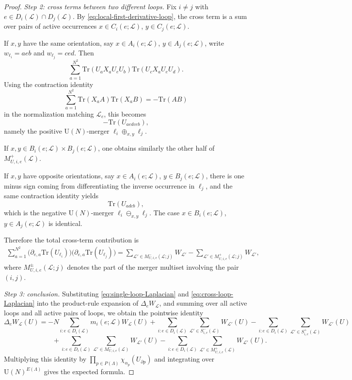 \documentclass[10pt,a4paper]{amsart}
\newcommand\Lc{{\mathcal{L}}}
\newcommand\Tr{\mathrm{Tr}}
\newcommand\U{{\mathrm U}}
\begin{document}
\begin{proof}
\smallskip

\emph{Step 2: cross terms between two different loops.}
Fix $i\neq j$ with $e\in D_i(\Lc)\cap D_j(\Lc)$. By \eqref{eq:local-first-derivative-loop}, the cross term is a sum over pairs of active occurrences $x\in C_i(e;\Lc)$, $y\in C_j(e;\Lc)$.

If $x,y$ have the same orientation, say $x\in A_i(e;\Lc)$, $y\in A_j(e;\Lc)$, write $w_{\ell_i}=aeb$ and $w_{\ell_j}=ced$. Then
\[
\sum_{a=1}^{N^2}\Tr(U_aX_aU_eU_b)\Tr(U_cX_aU_eU_d).
\]
Using the contraction identity
\[
\sum_{a=1}^{N^2}\Tr(X_aA)\Tr(X_aB)=-\Tr(AB)
\]
in the normalization matching $\Lc_e$, this becomes
\[
-\Tr(U_{aedceb}),
\]
namely the positive $\U(N)$-merger $\ell_i\oplus_{x,y}\ell_j$.

If $x,y\in B_i(e;\Lc)\times B_j(e;\Lc)$, one obtains similarly the other half of $M^+_{U,i,e}(\Lc)$.

If $x,y$ have opposite orientations, say $x\in A_i(e;\Lc)$, $y\in B_j(e;\Lc)$, there is one minus sign coming from differentiating the inverse occurrence in $\ell_j$, and the same contraction identity yields
\[
\Tr(U_{adcb}),
\]
which is the negative $\U(N)$-merger $\ell_i\ominus_{x,y}\ell_j$. The case $x\in B_i(e;\Lc)$, $y\in A_j(e;\Lc)$ is identical.

Therefore the total cross-term contribution is
\begin{align}
\sum_{a=1}^{N^2}
\bigl(\partial_{e,a}\Tr(U_{\ell_i})\bigr)\bigl(\partial_{e,a}\Tr(U_{\ell_j})\bigr)=\sum_{\Lc'\in M^-_{U,i,e}(\Lc;j)} W_{\Lc'}-\sum_{\Lc'\in M^+_{U,i,e}(\Lc;j)} W_{\Lc'},
\label{eq:cross-loop-Laplacian}
\end{align}
where $M^\pm_{U,i,e}(\Lc;j)$ denotes the part of the merger multiset involving the pair
$(i,j)$.

\smallskip

\emph{Step 3: conclusion.}
Substituting \eqref{eq:single-loop-Laplacian} and \eqref{eq:cross-loop-Laplacian} into the product-rule expansion of $\Delta_eW_{\Lc}$, and summing over all active loops and all active pairs of loops, we obtain the pointwise identity
\[
\Delta_eW_{\Lc}(U)=-N\sum_{i:e\in D_i(\Lc)} m_i(e;\Lc)W_{\Lc}(U)+\sum_{i:e\in D_i(\Lc)}\sum_{\Lc'\in S^-_{i,e}(\Lc)} W_{\Lc'}(U)-\sum_{i:e\in D_i(\Lc)}\sum_{\Lc'\in S^+_{i,e}(\Lc)} W_{\Lc'}(U)
\]
\[
\hspace{3cm}
+\sum_{i:e\in D_i(\Lc)}\sum_{\Lc'\in M^-_{U,i,e}(\Lc)} W_{\Lc'}(U)-\sum_{i:e\in D_i(\Lc)}\sum_{\Lc'\in M^+_{U,i,e}(\Lc)} W_{\Lc'}(U).
\]
Multiplying this identity by $\prod_{p\in P(\Lambda)}\chi_{\alpha_p}(U_{\partial p})$ and
integrating over $\U(N)^{E(\Lambda)}$ gives the expected formula.
\end{proof}
\end{document}
